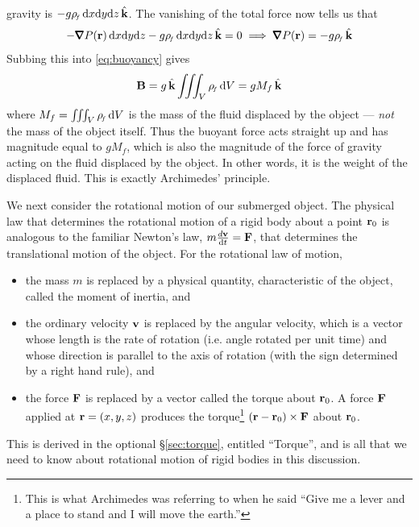 gravity is $- g{\rho_{\!{\scriptscriptstyle f}}}\,  \mathrm{d}x\mathrm{d}y\mathrm{d}z\,\hat{\mathbf{k}}$. The vanishing of 
the total force now tells us that
\begin{equation*}
-\vnabla P(\vr)\, \dee{x} \dee{y} \dee{z}
- g\rhof\,  \dee{x} \dee{y} \dee{z}\,\hk=0
\implies \vnabla P(\vr)= - g\rhof  \,\hk
\end{equation*}
Subbing this into \eqref{eq:buoyancy} gives
\begin{equation*}
\mathbf{B}= g\,\hat{\mathbf{k}}\iiint_{V}{\rho_{\!{\scriptscriptstyle f}}}\,\mathrm{d}V = gM_f\,\hat{\mathbf{k}}
\end{equation*}
where $M_f =\iiint_V {\rho_{\!{\scriptscriptstyle f}}}\,\mathrm{d}V$ is the mass of the fluid 
displaced by the object --- \emph{not} the mass of the object itself. 
Thus the buoyant force acts straight up and has magnitude equal to
$gM_f $, which is also the magnitude of the force of gravity acting on the 
fluid displaced by the object. In other words, it is the weight of the 
displaced fluid. This is exactly Archimedes' principle. 

We next consider the rotational motion of our submerged object. The physical
law that determines the rotational motion of a rigid body about a point
$\mathbf{r}_0$ is analogous to the familiar Newton's law, $m\frac{d\mathbf{v}}{\mathrm{d}t}=\mathbf{F}$, 
that determines the translational motion of the object. For the rotational
law of motion, 
\begin{itemize}\itemsep1pt \parskip0pt  %
\item[$\circ$]
the mass $m$ is replaced by a physical quantity, characteristic
of the object, called the moment of inertia, and
\item[$\circ$] 
the ordinary velocity $\mathbf{v}$ is replaced by the angular 
velocity, which is a vector whose length is the rate of rotation (i.e.
angle rotated per unit time) and whose direction is parallel to the axis
of rotation (with the sign determined by a right hand rule), and 
\item[$\circ$] the force $\mathbf{F}$ 
is replaced by a vector called the torque about $\mathbf{r}_0$.  A force $\mathbf{F}$ applied 
at $\mathbf{r}=(x,y,z)$ produces the torque\footnote{This is what Archimedes was referring to when he said ``Give me a lever and a place to stand and I will move the earth.''} $(\mathbf{r}-\mathbf{r}_0)\times\mathbf{F}$ about $\mathbf{r}_0$. 
\end{itemize}
This is derived in the optional \S\ref{sec:torque}, entitled ``Torque'', 
and is all that we need to know about rotational motion of rigid bodies in 
this discussion.


